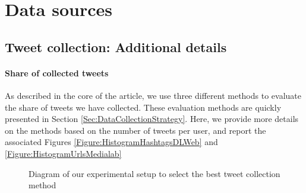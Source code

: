





\section{Data sources\label{Sec:Sources}}

\subsection{Tweet collection: Additional details\label{Sec:OA_Tweet}}

\paragraph{Share of collected tweets}

As described in the core of the article, we use three different methods to evaluate the share of tweets we have collected. These evaluation methods are quickly presented in Section \ref{Sec:DataCollectionStrategy}. Here, we provide more details on the methods based on the number of tweets per user, and report the associated Figures \ref{Figure:HistogramHashtagsDLWeb} and \ref{Figure:HistogramUrlsMedialab}

\begin{figure}[h]
\caption{Diagram of our experimental setup to select the best tweet collection method}
\label{Figure:ExperimentalSetup}
\end{figure}

